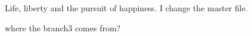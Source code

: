 \documentclass{article}
\begin{document}
Life, liberty and the pursuit of happiness.
I change the master file.

where the branch3 comes from?
\end{document}
